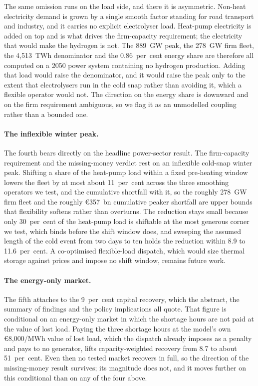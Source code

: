 The same omission runs on the load side, and there it is asymmetric. Non-heat electricity
demand is grown by a single smooth factor standing for road transport and industry, and it
carries no explicit electrolyser load. Heat-pump electricity is added on top and is what
drives the firm-capacity requirement; the electricity that would make the hydrogen is
not. The 889~GW peak, the 278~GW firm fleet, the 4{,}513~TWh denominator and the
0.86~per~cent energy share are therefore all computed on a 2050 power system containing no
hydrogen production. Adding that load would raise the denominator, and it would raise the
peak only to the extent that electrolysers run in the cold snap rather than avoiding it,
which a flexible operator would not. The direction on the energy share is downward and on
the firm requirement ambiguous, so we flag it as an unmodelled coupling rather than a
bounded one.

\paragraph{The inflexible winter peak.} The fourth bears directly on the headline
power-sector result. The firm-capacity requirement and the missing-money verdict rest on
an inflexible cold-snap winter peak. Shifting a share of the heat-pump load within a
fixed pre-heating window lowers the fleet by at most about 11~per~cent across the three
smoothing operators we test, and the cumulative shortfall with it, so the roughly 278~GW
firm fleet and the roughly \euro{}357~bn cumulative peaker shortfall are upper bounds
that flexibility softens rather than overturns. The reduction stays small because only
30~per~cent of the heat-pump load is shiftable at the most generous corner we test, which
binds before the shift window does, and sweeping the assumed length of the cold event
from two days to ten holds the reduction within 8.9 to 11.6~per~cent. A
co-optimised flexible-load dispatch, which would size thermal storage against prices and
impose no shift window, remains future work.

\paragraph{The energy-only market.} The fifth attaches to the 9~per~cent capital
recovery, which the abstract, the summary of findings and the policy implications all
quote. That figure is conditional on an energy-only market in which the shortage hours are
not paid at the value of lost load.
Paying the three shortage hours at the model's own \euro{}8{,}000/MWh value of lost load,
which the dispatch already imposes as a penalty and pays to no generator, lifts
capacity-weighted recovery from 8.7 to about 51~per~cent. Even then no tested market recovers in full, so the direction of the
missing-money result survives; its magnitude does not, and
it moves further on this conditional than on any of the four above.

